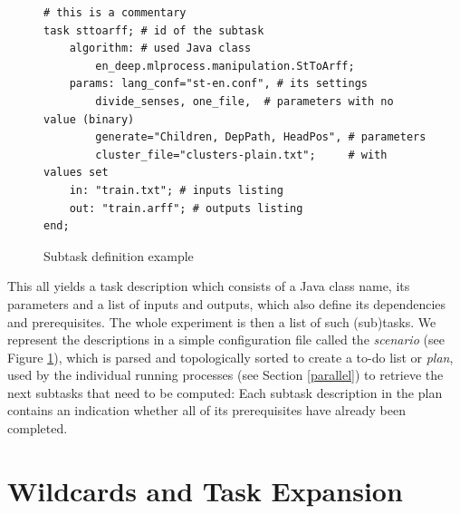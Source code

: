 \documentclass[12pt,notitlepage,a4paper]{report}
\begin{document}
\begin{figure}
\caption{Subtask definition example}\label{fig:scenario}
\begin{center}
\begin{lstlisting}
# this is a commentary
task sttoarff; # id of the subtask
    algorithm: # used Java class
        en_deep.mlprocess.manipulation.StToArff;
    params: lang_conf="st-en.conf", # its settings
        divide_senses, one_file,  # parameters with no value (binary)
        generate="Children, DepPath, HeadPos", # parameters
        cluster_file="clusters-plain.txt";     # with values set
    in: "train.txt"; # inputs listing
    out: "train.arff"; # outputs listing
end;
\end{lstlisting}
\end{center}
\end{figure}

This all yields a task description which consists of a Java class name, its parameters and a list of inputs and outputs, which also define its dependencies and prerequisites. The whole experiment is then a list of such (sub)tasks. We represent the descriptions in a simple configuration file called the \emph{scenario} (see Figure \ref{fig:scenario}), which is parsed and topologically sorted \citep{kahn62} to create a to-do list or \emph{plan}, used by the individual running processes (see Section \ref{parallel}) to retrieve the next subtasks that need to be computed: Each subtask description in the plan contains an indication whether all of its prerequisites have already been completed.

\section{Wildcards and Task Expansion}\label{expansions}
\end{document}

